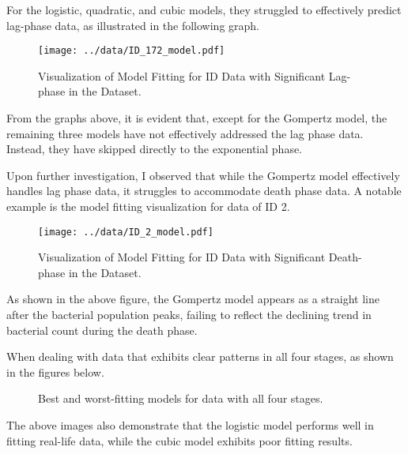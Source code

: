 \documentclass[11pt]{article}
\begin{document}
For the logistic, quadratic, and cubic models, they struggled to effectively predict lag-phase data, as illustrated in the following graph.
\begin{figure}[h]
  \centering
  \texttt{[image: ../data/ID\_172\_model.pdf]}
  \caption{Visualization of Model Fitting for ID Data with Significant Lag-phase in the Dataset.}
\end{figure}\par
From the graphs above, it is evident that, except for the Gompertz model, the remaining three models have not effectively addressed the lag phase data. Instead, they have skipped directly to the exponential phase.\par
Upon further investigation, I observed that while the Gompertz model effectively handles lag phase data, it struggles to accommodate death phase data. A notable example is the model fitting visualization for data of ID 2.
\begin{figure}[h]
  \centering
  \texttt{[image: ../data/ID\_2\_model.pdf]}
  \caption{Visualization of Model Fitting for ID Data with Significant Death-phase in the Dataset.}
\end{figure}\par
As shown in the above figure, the Gompertz model appears as a straight line after the bacterial population peaks, failing to reflect the declining trend in bacterial count during the death phase.\par
When dealing with data that exhibits clear patterns in all four stages, as shown in the figures below.
\begin{figure}[H]
 \hfill
\caption{Best and worst-fitting models for data with all four stages.}
\end{figure}\par
The above images also demonstrate that the logistic model performs well in fitting real-life data, while the cubic model exhibits poor fitting results.


\end{document}
